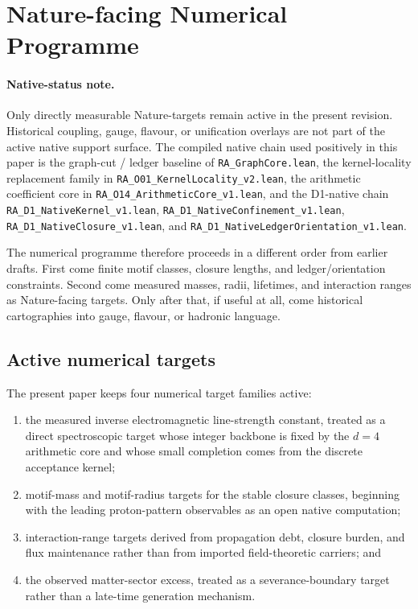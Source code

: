 \documentclass[11pt]{article}
\begin{document}
\section{Nature-facing Numerical Programme}
\label{sec:couplings}

\paragraph{Native-status note.} Only directly measurable Nature-targets remain active in the present revision. Historical coupling, gauge, flavour, or unification overlays are not part of the active native support surface. The compiled native chain used positively in this paper is the graph-cut / ledger baseline of \texttt{RA\_GraphCore.lean}, the kernel-locality replacement family in \texttt{RA\_O01\_KernelLocality\_v2.lean}, the arithmetic coefficient core in \texttt{RA\_O14\_ArithmeticCore\_v1.lean}, and the D1-native chain \texttt{RA\_D1\_NativeKernel\_v1.lean}, \texttt{RA\_D1\_NativeConfinement\_v1.lean}, \texttt{RA\_D1\_NativeClosure\_v1.lean}, and \texttt{RA\_D1\_NativeLedgerOrientation\_v1.lean}.

The numerical programme therefore proceeds in a different order from earlier drafts. First come finite motif classes, closure lengths, and ledger/orientation constraints. Second come measured masses, radii, lifetimes, and interaction ranges as Nature-facing targets. Only after that, if useful at all, come historical cartographies into gauge, flavour, or hadronic language.

\subsection{Active numerical targets}

The present paper keeps four numerical target families active:
\begin{enumerate}[nosep]
    \item the measured inverse electromagnetic line-strength constant, treated as a direct spectroscopic target whose integer backbone is fixed by the $d=4$ arithmetic core and whose small completion comes from the discrete acceptance kernel;
    \item motif-mass and motif-radius targets for the stable closure classes, beginning with the leading proton-pattern observables as an open native computation;
    \item interaction-range targets derived from propagation debt, closure burden, and flux maintenance rather than from imported field-theoretic carriers; and
    \item the observed matter-sector excess, treated as a severance-boundary target rather than a late-time generation mechanism.
\end{enumerate}
\end{document}
